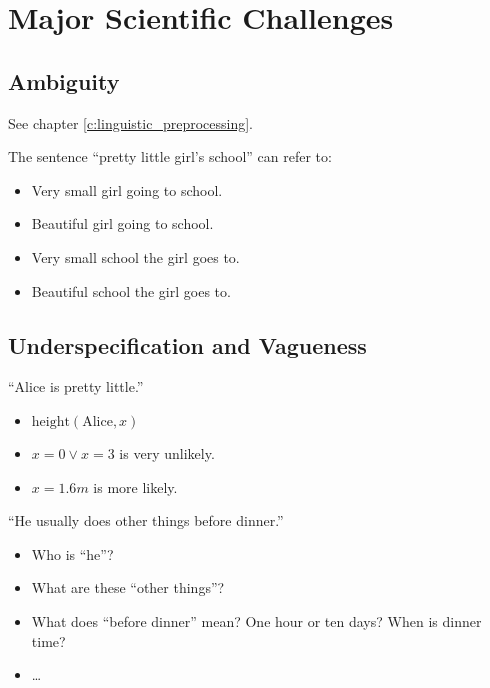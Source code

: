 \documentclass[a4paper, 11pt, accentcolor = tud3b]{tudreport}
\providecommand{\ambiguity}[1]{\textcolor{ambiguityorange}{#1}}
\begin{document}
        \section{Major Scientific Challenges} %
            \subsection{Ambiguity} %
            	See chapter \ref{c:linguistic_preprocessing}.
            	
            	The sentence \enquote{\ambiguity{pretty} little girl's school} can refer to:
            	\begin{itemize}
            		\item Very small girl going to school.
            		\item Beautiful girl going to school.
            		\item Very small school the girl goes to.
            		\item Beautiful school the girl goes to.
            	\end{itemize}

            \subsection{Underspecification and Vagueness} %
                \enquote{Alice is pretty little.}
                \begin{itemize}
                	\item \( \text{height}(\text{Alice}, x) \)
                	\item \( x = 0 \lor x = 3 \) is very unlikely.
                	\item \( x = 1.6m \) is more likely.
                \end{itemize}
            
            	\enquote{He usually does other things before dinner.}
            	\begin{itemize}
            		\item Who is \enquote{he}?
            		\item What are these \enquote{other things}?
            		\item What does \enquote{before dinner} mean? One hour or ten days? When is dinner time?
            		\item \dots
            	\end{itemize}
\end{document}
